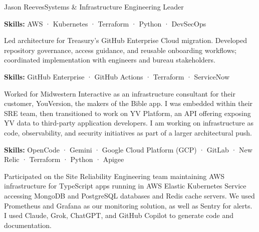 \documentclass{article}
\begin{document}
\begin{cv}{Jason Reeves}{Systems \& Infrastructure Engineering Leader}
\begin{cvevent}[June 2026][present]
    \textbf{Skills:}  AWS · Kubernetes · Terraform · Python · DevSecOps

    \vspace*{5mm}
\end{cvevent}

\begin{cvevent}[April 2026][June 2026]
    Led architecture for Treasury's GitHub Enterprise Cloud migration. Developed repository governance, access guidance, and reusable onboarding workflows; coordinated implementation with engineers and bureau stakeholders.
    \vspace*{3mm}

    \textbf{Skills:}  GitHub Enterprise · GitHub Actions · Terraform · ServiceNow

    \vspace*{5mm}
\end{cvevent}

\begin{cvevent}[October 2025][April 2026]
    Worked for Midwestern Interactive as an infrastructure consultant for their customer, YouVersion, the makers of the Bible app.  I was embedded within their SRE team, then transitioned to work on YV Platform, an API offering exposing YV data to third-party application developers.  I am working on infrastructure as code, observability, and security initiatives as part of a larger architectural push.
    \vspace*{3mm}

\textbf{Skills:}  OpenCode · Gemini · Google Cloud Platform (GCP) · GitLab · New Relic · Terraform · Python · Apigee  
    
    \vspace*{5mm}
\end{cvevent}
    
\begin{cvevent}[June 2024][December 2025]
    Participated on the Site Reliability Engineering team maintaining AWS infrastructure for TypeScript apps running in AWS Elastic Kubernetes Service accessing MongoDB and PostgreSQL databases and Redis cache servers.  We used Prometheus and Grafana as our monitoring solution, as well as Sentry for alerts.  I used Claude, Grok, ChatGPT, and GitHub Copilot to generate code and documentation.
    \vspace*{3mm}


\end{cvevent}
\end{cv}
\end{document}
